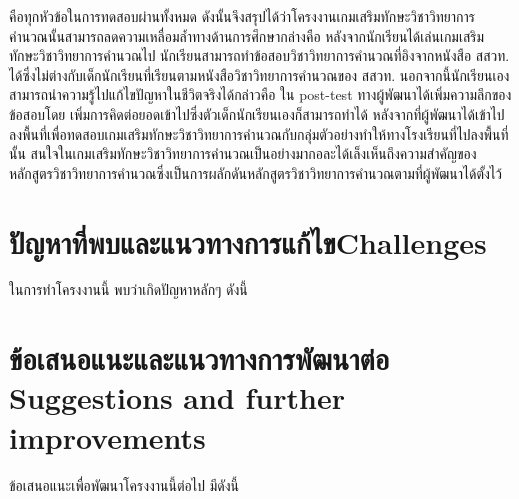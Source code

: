 คือทุกหัวข้อในการทดสอบผ่านทั้งหมด ดังนั้นจึงสรุปได้ว่าโครงงานเกมเสริมทักษะวิชาวิทยาการคำนวณนั้นสามารถลดความเหลื่อมล้ำทางด้านการศึกษากล่างคือ หลังจากนักเรียนได้เล่นเกมเสริมทักษะวิชาวิทยาการคำนวณไป
นักเรียนสามารถทำข้อสอบวิชาวิทยาการคำนวณที่อิงจากหนังสือ สสวท. ได้ซึ่งไม่ต่างกับเด็กนักเรียนที่เรียนตามหนังสือวิชาวิทยาการคำนวณของ สสวท. 
นอกจากนี้นักเรียนเองสามารถนำความรู้ไปแก้ไขปัญหาในชีวิตจริงได้กล่าวคือ ใน post-test ทางผู้พัฒนาได้เพิ่มความลึกของข้อสอบโดย
เพิ่มการคิดต่อยอดเข้าไปซึ่งตัวเด็กนักเรียนเองก็สามารถทำได้ หลังจากที่ผู้พัฒนาได้เข้าไปลงพื้นที่เพื่อทดสอบเกมเสริมทักษะวิชาวิทยาการคำนวณกับกลุ่มตัวอย่างทำให้ทางโรงเรียนที่ไปลงพื้นที่นั้น
สนใจในเกมเสริมทักษะวิชาวิทยาการคำนวณเป็นอย่างมากอละได้เล็งเห็นถึงความสำคัญของหลักสูตรวิชาวิทยาการคำนวณซึ่งเป็นการผลักดันหลักสูตรวิชาวิทยาการคำนวณตามที่ผู้พัฒนาได้ตั้งไว้

\section{\ifcpe ปัญหาที่พบและแนวทางการแก้ไข\else Challenges\fi}

ในการทำโครงงานนี้ พบว่าเกิดปัญหาหลักๆ ดังนี้

\section{\ifcpe%
ข้อเสนอแนะและแนวทางการพัฒนาต่อ
\else%
Suggestions and further improvements
\fi
}

ข้อเสนอแนะเพื่อพัฒนาโครงงานนี้ต่อไป มีดังนี้
